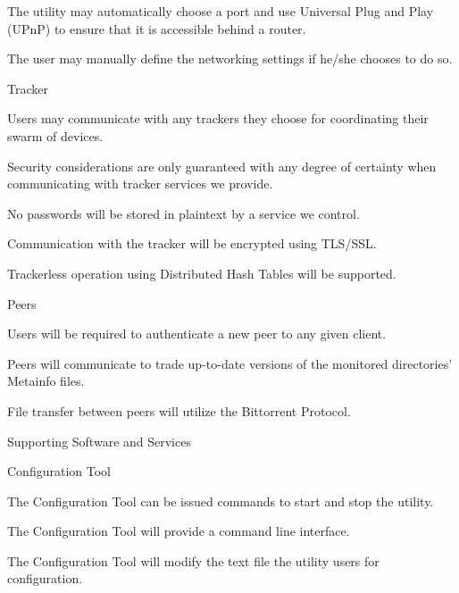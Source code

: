 \documentclass[12 pt]{article}
\begin{document}
\begin{enum}
\begin{enum}
\begin{enum}
\begin{enum}
					\item The utility may automatically choose a port and use Universal Plug and Play (UPnP) to ensure that it is accessible behind a router.
					\item The user may manually define the networking settings if he/she chooses to do so.
				\end{enum}
				\item Tracker
				\begin{enum}
					\item Users may communicate with any trackers they choose for coordinating their swarm of devices.
					\item Security considerations are only guaranteed with any degree of certainty when communicating with tracker services we provide.
					\begin{enum}
						\item No passwords will be stored in plaintext by a service we control.
						\item Communication with the tracker will be encrypted using TLS/SSL.
					\end{enum}
					\item Trackerless operation using Distributed Hash Tables will be supported.
				\end{enum}
				\item Peers
				\begin{enum}
					\item Users will be required to authenticate a new peer to any given client.
					\item Peers will communicate to trade up-to-date versions of the monitored directories' Metainfo files.
					\item File transfer between peers will utilize the Bittorrent Protocol.
				\end{enum}
			\end{enum}
		\end{enum}
		\item Supporting Software and Services
		\begin{enum}
			\item Configuration Tool
			\begin{enum}
				\item The Configuration Tool can be issued commands to start and stop the utility.
				\item The Configuration Tool will provide a command line interface.
				\item The Configuration Tool will modify the text file the utility users for configuration.

\end{enum}
\end{enum}
\end{enum}
\end{document}
